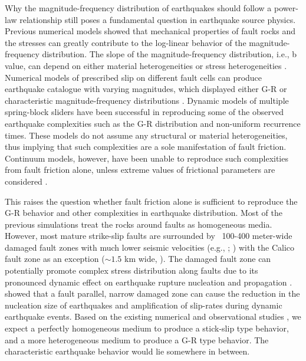 \documentclass[11pt]{article}
\newcommand{\yihe}[1]{{\color{red}#1}}
\begin{document}
Why the magnitude-frequency distribution of earthquakes should follow a power-law relationship still poses a fundamental question in earthquake source physics. Previous numerical models \citep{rundle_jackson_1977, rundle_1989} showed that mechanical properties of fault rocks and the stresses can greatly contribute to the \yihe{log-linear} behavior of the magnitude-frequency distribution. The slope of the magnitude-frequency distribution, i.e., b value, can depend on either material heterogeneities \citep{mogi_1962} or stress heterogeneities \citep{scholz_1968}. Numerical models of prescribed slip on different fault cells can produce earthquake catalogue with varying magnitudes, which displayed either G-R or characteristic magnitude-frequency distributions \citep{benzion_rice_1995}. Dynamic models of multiple spring-block sliders \citep{carlson_langer_1989, shaw_1995} have been successful in reproducing some of the observed earthquake complexities such as the G-R distribution and non-uniform recurrence times. These models do not assume any structural or material heterogeneities, thus implying that such complexities are a sole manifestation of fault friction. Continuum models, however, have been unable to reproduce such complexities from fault friction alone, unless extreme values of frictional parameters are considered \citep{cochard_madariaga_1996, hillers_2006}.

This raises the question whether fault friction alone is sufficient to reproduce the G-R behavior and other complexities in earthquake distribution. Most of the previous simulations treat the rocks around faults as homogeneous media. However, most mature strike-slip faults are surrounded by ~100-400 meter-wide damaged fault zones with much lower seismic velocities (e.g., \citealp{benzion_sammis_2003}; \citealp[table 1]{huang_2014}) with the Calico fault zone as an exception \yihe{($\sim 1.5$ km wide, \citealp{cochran_2009})}. The damaged fault zone can potentially promote complex stress distribution along faults due to its pronounced dynamic effect on earthquake rupture nucleation and propagation \citep{harris_day_1997,huang_ampuero_2011, huang_2014, ma_elbanna_2015, albertini_kammer_2017, weng_2016, huang_2018}. \yihe{\citep{kaneko_2011} showed that a fault parallel, narrow damaged zone can cause the reduction in the nucleation size of earthquakes and amplification of slip-rates during dynamic earthquake events.} Based on the existing numerical and observational studies \citep{wesnousky_1994, hillers_2006, aochi_ide_2009}, we expect a perfectly homogeneous medium to produce a stick-slip type behavior, and a more heterogeneous medium to produce a G-R type behavior. The characteristic earthquake behavior would lie somewhere in between.
\end{document}
